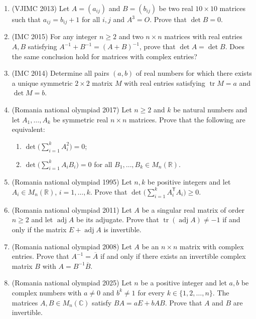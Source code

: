 \documentclass[11pt,a4paper]{article}
\DeclareMathOperator{\tr}{tr}
\DeclareMathOperator{\adj}{adj}
\newcommand{\T}{\mathsf T}
\begin{document}
\begin{enumerate}
\item (VJIMC 2013) Let $A=(a_{ij})$ and $B=(b_{ij})$ be two real $10\times10$ matrices such that
$a_{ij}=b_{ij}+1$ for all $i,j$ and $A^3=O$. Prove that $\det B=0$.

\item (IMC 2015) For any integer $n\geqslant2$ and two $n\times n$ matrices with real entries
$A,B$ satisfying $A^{-1}+B^{-1}=(A+B)^{-1}$, prove that $\det A=\det B$. Does the same
conclusion hold for matrices with complex entries?

\item (IMC 2014) Determine all pairs $(a,b)$ of real numbers for which there exists a unique
symmetric $2\times2$ matrix $M$ with real entries satisfying $\tr M=a$ and $\det M=b$.

\item (Romania national olympiad 2017) Let $n\geqslant2$ and $k$ be natural numbers and let
$A_1,\dots,A_k$ be symmetric real $n\times n$ matrices. Prove that the following are equivalent:
\begin{enumerate}[label=\arabic*),align=left]
\item $\det\bigl(\sum_{i=1}^kA_i^2\bigr)=0$;
\item $\det\bigl(\sum_{i=1}^kA_iB_i\bigr)=0$ for all $B_1,\dots,B_k\in M_n(\mathbb R)$.
\end{enumerate}

\item (Romania national olympiad 1995) Let $n,k$ be positive integers and let
$A_i\in M_n(\mathbb R)$, $i=1,\dots,k$. Prove that
$\det\bigl(\sum_{i=1}^kA_i^\T A_i\bigr)\geqslant0$.

\item (Romania national olympiad 2011) Let $A$ be a singular real matrix of order $n\geqslant2$
and let $\adj A$ be its adjugate. Prove that $\tr(\adj A)\ne-1$ if and only if the matrix
$E+\adj A$ is invertible.

\item (Romania national olympiad 2008) Let $A$ be an $n\times n$ matrix with complex entries.
Prove that $A^{-1}=\overline A$ if and only if there exists an invertible complex matrix $B$ with
$A=B^{-1}\overline B$.

\item (Romania national olympiad 2025) Let $n$ be a positive integer and let $a,b$ be complex
numbers with $a\ne0$ and $b^k\ne1$ for every $k\in\{1,2,\dots,n\}$. The matrices
$A,B\in M_n(\mathbb C)$ satisfy $BA=aE+bAB$. Prove that $A$ and $B$ are invertible.


\end{enumerate}
\end{document}
